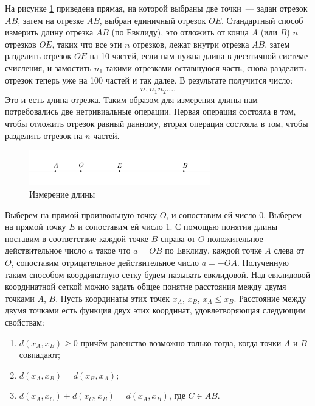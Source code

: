 \documentclass[a4paper,14pt]{extreport} %
\begin{document}
	На рисунке \ref{fig1g} приведена прямая, на которой выбраны две точки~--- задан отрезок $AB$, затем на отрезке $AB$, выбран единичный отрезок $OE$. Стандартный способ измерить длину отрезка $AB$ (по Евклиду), это отложить от конца $A$ (или $B$) $n$ отрезков $OE$, таких что все эти $n$ отрезков, лежат внутри отрезка $AB$, затем разделить отрезок $OE$ на 10 частей, если нам нужна длина в десятичной системе счисления, и замостить $n_1$ такими отрезками оставшуюся часть, снова разделить отрезок теперь уже на 100 частей и так далее. В результате получится число:
	\[
		\overline{n{,}n_1n_2\ldots}.
	\]
	Это и есть длина отрезка. Таким образом для измерения длины нам потребовались две нетривиальные операции. Первая операция состояла в том, чтобы отложить отрезок равный данному, вторая операция состояла в том, чтобы разделить отрезок на $n$ частей.
	
	\begin{figure}[h]
		\centering
		\includegraphics[width = 0.7\textwidth]{images/png/1.png}
		\caption{Измерение длины}
		\label{fig1g}
	\end{figure}
	
	Выберем на прямой произвольную точку $O$, и сопоставим ей число 0. Выберем на прямой точку $E$ и сопоставим ей число 1. С помощью понятия длины поставим в соответствие каждой точке $B$ справа от $O$ положительное действительное число $a$ такое что $a = OB$ по Евклиду, каждой точке $A$ слева от $O$, сопоставим отрицательное действительное число $a = - OA$. Полученную таким способом координатную сетку будем называть евклидовой. Над евклидовой координатной сеткой можно задать общее понятие расстояния между двумя точками $A$, $B$. Пусть координаты этих точек $x_A$, $x_B$, $x_A \leqslant x_B$. Расстояние между двумя точками есть функция двух этих координат, удовлетворяющая следующим свойствам:
	
	\begin{enumerate}
		\item $d(x_A, x_B) \geqslant 0$ причём равенство возможно только тогда, когда точки $A$ и $B$ совпадают;
		\item $d(x_A, x_B) = d(x_B, x_A)$;
		\item $d(x_A, x_C) + d(x_C, x_B) = d(x_A, x_B)$, где $C\in AB$.
	\end{enumerate}
	
\end{document}

